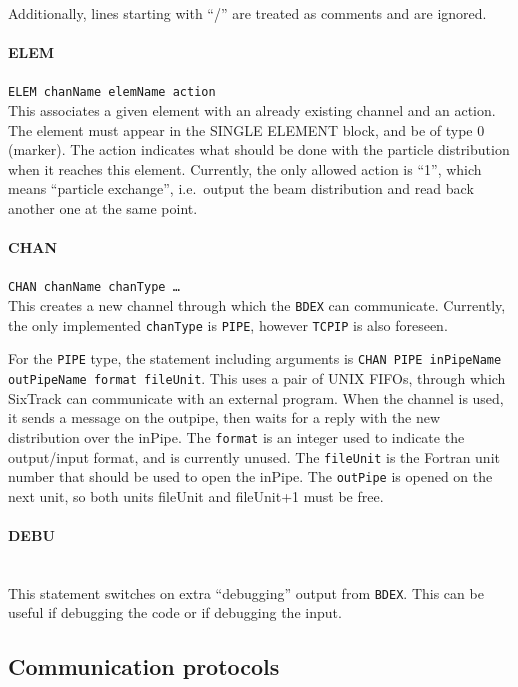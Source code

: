 \bigskip
Additionally, lines starting with ``/'' are treated as comments and are ignored.

\paragraph{ELEM} \texttt{ELEM chanName elemName action}\\

This associates a given element with an already existing channel and an action.
The element must appear in the SINGLE ELEMENT block, and be of type 0 (marker).
The action indicates what should be done with the particle distribution when it reaches this element.
Currently, the only allowed action is ``1'', which means ``particle exchange'', i.e.\ output the beam distribution and read back another one at the same point.

\paragraph{CHAN} \texttt{CHAN chanName chanType \ldots}\\

This creates a new channel through which the \texttt{BDEX} can communicate.
Currently, the only implemented \texttt{chanType} is \texttt{PIPE}, however \texttt{TCPIP} is also foreseen.

For the \texttt{PIPE} type, the statement including arguments is \texttt{CHAN PIPE inPipeName outPipeName format fileUnit}.
This uses a pair of UNIX FIFOs, through which SixTrack can communicate with an external program.
When the channel is used, it sends a message on the outpipe, then waits for a reply with the new distribution over the inPipe.
The \texttt{format} is an integer used to indicate the output/input format, and is currently unused.
The \texttt{fileUnit} is the Fortran unit number that should be used to open the inPipe.
The \texttt{outPipe} is opened on the next unit, so both units fileUnit and fileUnit+1 must be free.

\paragraph{DEBU}~\\

This statement switches on extra ``debugging'' output from \texttt{BDEX}.
This can be useful if debugging the code or if debugging the input.

\subsection{Communication protocols}

